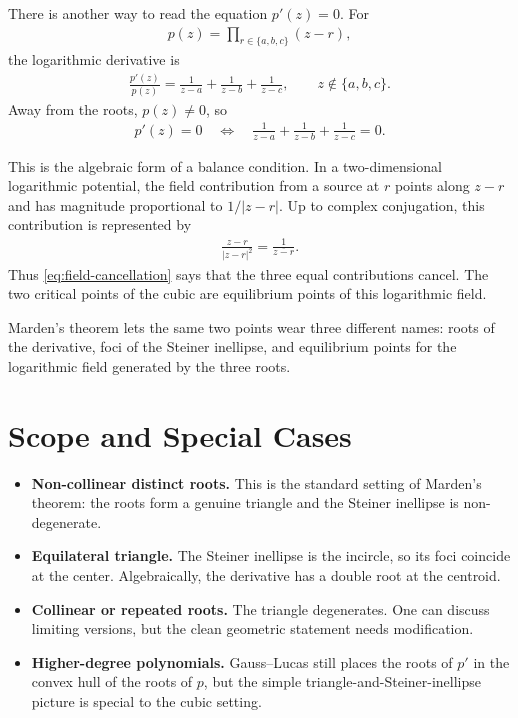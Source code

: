 \documentclass[11pt]{article}
\begin{document}
There is another way to read the equation \(p'(z)=0\). For
\begin{align}
  p(z)=\prod_{r\in\{a,b,c\}}(z-r),
\end{align}
the logarithmic derivative is
\begin{align}
  \frac{p'(z)}{p(z)}
    =
    \frac{1}{z-a}+\frac{1}{z-b}+\frac{1}{z-c},
  \qquad z\notin\{a,b,c\}.
  \label{eq:logarithmic-derivative}
\end{align}
Away from the roots, \(p(z)\ne 0\), so
\begin{align}
  p'(z)=0
  \quad\Longleftrightarrow\quad
  \frac{1}{z-a}+\frac{1}{z-b}+\frac{1}{z-c}=0.
  \label{eq:field-cancellation}
\end{align}

This is the algebraic form of a balance condition. In a two-dimensional logarithmic potential, the field contribution from a source at \(r\) points along \(z-r\) and has magnitude proportional to \(1/|z-r|\). Up to complex conjugation, this contribution is represented by
\begin{align}
  \frac{z-r}{|z-r|^2}=\frac{1}{\overline{z-r}}.
\end{align}
Thus \cref{eq:field-cancellation} says that the three equal contributions cancel. The two critical points of the cubic are equilibrium points of this logarithmic field.

\begin{intuitionbox}
Marden's theorem lets the same two points wear three different names: roots of the derivative, foci of the Steiner inellipse, and equilibrium points for the logarithmic field generated by the three roots.
\end{intuitionbox}

\section{Scope and Special Cases}

\begin{itemize}
  \item \textbf{Non-collinear distinct roots.} This is the standard setting of Marden's theorem: the roots form a genuine triangle and the Steiner inellipse is non-degenerate.
  \item \textbf{Equilateral triangle.} The Steiner inellipse is the incircle, so its foci coincide at the center. Algebraically, the derivative has a double root at the centroid.
  \item \textbf{Collinear or repeated roots.} The triangle degenerates. One can discuss limiting versions, but the clean geometric statement needs modification.
  \item \textbf{Higher-degree polynomials.} Gauss--Lucas still places the roots of \(p'\) in the convex hull of the roots of \(p\), but the simple triangle-and-Steiner-inellipse picture is special to the cubic setting.
\end{itemize}
\end{document}
